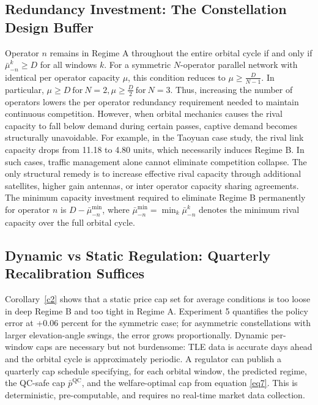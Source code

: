 \documentclass[review,3p,authoryear]{elsarticle}
\begin{document}
\subsection{Redundancy Investment: The Constellation Design Buffer}

Operator $n$ remains in Regime A throughout the entire orbital cycle if and only if $\bar{{\mu}}_{-n}^{k}{\ge}D$ for all windows $k$. For a symmetric $N$-operator parallel network with identical per operator capacity ${\mu}$, this condition reduces to ${\mu}{\ge}\frac{D}{N-1}.$ In particular, ${\mu}{\ge}D~\mathrm{for}~ N=2,{\mu}{\ge}\frac{D}{2} ~\mathrm{for}~ N=3.$ Thus, increasing the number of operators lowers the per operator redundancy requirement needed to maintain continuous competition. However, when orbital mechanics causes the rival capacity to fall below demand during certain passes, captive demand becomes structurally unavoidable. For example, in the Taoyuan case study, the rival link capacity drops from 11.18 to 4.80 units, which necessarily induces Regime B. In such cases, traffic management alone cannot eliminate competition collapse. The only structural remedy is to increase effective rival capacity through additional satellites, higher gain antennas, or inter operator capacity sharing agreements. The minimum capacity investment required to eliminate Regime B permanently for operator $n$ is $D-\bar{{\mu}}_{-n}^{\min}$, where $\bar{{\mu}}_{-n}^{\min}=\min_{k}\bar{{\mu}}_{-n}^{k}$ denotes the minimum rival capacity over the full orbital cycle.

\subsection{Dynamic vs Static Regulation: Quarterly Recalibration Suffices}

Corollary~\ref{c2} shows that a static price cap set for average conditions is too loose in deep Regime B and too tight in Regime A. Experiment 5 quantifies the policy error at +0.06 percent for the symmetric case; for asymmetric constellations with larger elevation-angle swings, the error grows proportionally. Dynamic per-window caps are necessary but not burdensome: TLE data is accurate days ahead and the orbital cycle is approximately periodic. A regulator can publish a quarterly cap schedule specifying, for each orbital window, the predicted regime, the QC-safe cap $\bar{p}^{\mathrm{QC}}$, and the welfare-optimal cap from equation \eqref{eq7}. This is deterministic, pre-computable, and requires no real-time market data collection.
\end{document}
